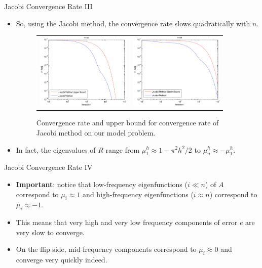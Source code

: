 \documentclass{beamer}
\begin{document}
\begin{frame}{Jacobi Convergence Rate III}
 \begin{itemize}
  \item So, using the Jacobi method, the convergence rate slows quadratically
        with $n$.
  \begin{figure}
   \begin{tabular}{cc}
    \includegraphics[width=4.5cm]{images/jacobiConvergence_32.pdf} & \includegraphics[width=4.5cm]{images/jacobiConvergence_64.pdf}
   \end{tabular}
   \caption{Convergence rate and upper bound for convergence rate of Jacobi
            method on our model problem.}
  \end{figure}
  \item In fact, the eigenvalues of $R$ range from $\mu_1^h \approx 1-\pi^2h^2/2$
        to $\mu_n^h \approx -\mu_1^h$.
 \end{itemize}
\end{frame}

\begin{frame}{Jacobi Convergence Rate IV}
 \begin{itemize}
  \item \textbf{Important}: notice that low-frequency eigenfunctions ($i\ll n$)
        of $A$ correspond to $\mu_i \approx 1$ and high-frequency eigenfunctions
        ($i \approx n$) correspond to $\mu_i \approx -1$.
  \item This means that very high and very low frequency components of error $e$
        are very slow to converge.
  \item On the flip side, mid-frequency components correspond to
        $\mu_i \approx 0$ and converge very quickly indeed.
 \end{itemize}
\end{frame}
\end{document}
